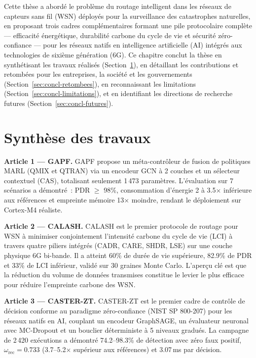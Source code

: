 \label{sec:Conclusion}

Cette thèse a abordé le problème du routage intelligent dans les réseaux de capteurs sans fil (WSN) déployés pour la surveillance des catastrophes naturelles, en proposant trois cadres complémentaires formant une pile protocolaire complète --- efficacité énergétique, durabilité carbone du cycle de vie et sécurité zéro-confiance --- pour les réseaux natifs en intelligence artificielle (AI) intégrés aux technologies de sixième génération (6G). Ce chapitre conclut la thèse en synthétisant les travaux réalisés (Section~\ref{sec:concl-synthese}), en détaillant les contributions et retombées pour les entreprises, la société et les gouvernements (Section~\ref{sec:concl-retombees}), en reconnaissant les limitations (Section~\ref{sec:concl-limitations}), et en identifiant les directions de recherche futures (Section~\ref{sec:concl-futures}).

\section{Synthèse des travaux}\label{sec:concl-synthese}

\textbf{Article 1 --- GAPF.}
GAPF propose un méta-contrôleur de fusion de politiques MARL (QMIX et QTRAN) via un encodeur GCN à 2 couches et un sélecteur contextuel (CAS), totalisant seulement 1\,473 paramètres. L'évaluation sur 7 scénarios a démontré~: PDR $\geq$ 98\%, consommation d'énergie 2 à 3.5$\times$ inférieure aux références et empreinte mémoire 13$\times$ moindre, rendant le déploiement sur Cortex-M4 réaliste.

\textbf{Article 2 --- CALASH.}
CALASH est le premier protocole de routage pour WSN à minimiser conjointement l'intensité carbone du cycle de vie (LCI) à travers quatre piliers intégrés (CADR, CARE, SHDR, LSE) sur une couche physique 6G bi-bande. Il a atteint 60\% de durée de vie supérieure, 82.9\% de PDR et 33\% de LCI inférieur, validé sur 30 graines Monte Carlo. L'aperçu clé est que la réduction du volume de données transmises constitue le levier le plus efficace pour réduire l'empreinte carbone des WSN.

\textbf{Article 3 --- CASTER-ZT.}
CASTER-ZT est le premier cadre de contrôle de décision conforme au paradigme zéro-confiance (NIST SP 800-207) pour les réseaux natifs en AI, couplant un encodeur GraphSAGE, un évaluateur neuronal avec MC-Dropout et un bouclier déterministe à 5 niveaux gradués. La campagne de 2\,420 exécutions a démontré 74.2--98.3\% de détection avec zéro faux positif, $\omega_{\text{rec}} = 0.733$ (3.7--5.2$\times$ supérieur aux références) et 3.07\,ms par décision.


